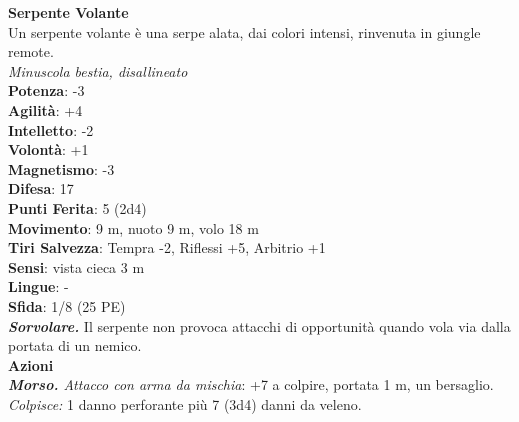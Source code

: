 \begin{multicols}{2}
\medskip\textbf{Serpente Volante}\\
Un serpente volante è una serpe alata, dai colori intensi, rinvenuta in giungle remote.\\
\emph{Minuscola bestia, disallineato}\\
\textbf{Potenza}: -3\\
\textbf{Agilità}: +4\\
\textbf{Intelletto}: -2\\
\textbf{Volontà}: +1\\
\textbf{Magnetismo}: -3\\
\textbf{Difesa}: 17\\
\textbf{Punti Ferita}: 5 (2d4)\\
\textbf{Movimento}: 9 m, nuoto 9 m, volo 18 m\\
\textbf{Tiri Salvezza}: Tempra -2, Riflessi +5, Arbitrio +1\\
\textbf{Sensi}: vista cieca 3 m\\
\textbf{Lingue}: -\\
\textbf{Sfida}: 1/8 (25 PE)\smallskip\\
\emph{\textbf{Sorvolare.}} Il serpente non provoca attacchi di opportunità quando vola via dalla portata di un nemico.\\
\smallskip\textbf{Azioni}\\
\emph{\textbf{Morso.} Attacco con arma da mischia}: +7 a colpire, portata 1 m, un bersaglio.\\
\emph{Colpisce:} 1 danno perforante più 7 (3d4) danni da veleno.\\


\end{multicols}
